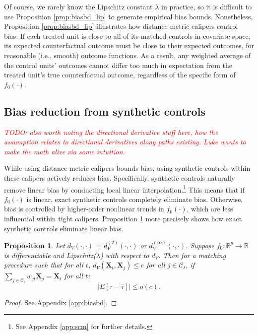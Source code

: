 \documentclass{article}
\newtheorem{proposition}[theorem]{Proposition}
\newcommand{\Xt}{\mathbf{X}_t}
\newcommand{\Xj}{\mathbf{X}_j}
\newcommand{\Ct}{\mathcal{C}_{t}}
\newcommand{\note}[1]{\textcolor{red}{\textit{#1}}}
\begin{document}
Of course, we rarely know the Lipschitz constant $\lambda$ in practice, so it is difficult to use Proposition \ref{prop:biasbd_lip} to generate empirical bias bounds.
Nonetheless, Proposition \ref{prop:biasbd_lip} illustrates how distance-metric calipers control bias:
If each treated unit is close to all of its matched controls in covariate space, its expected counterfactual outcome must be close to their expected outcomes, for reasonable (i.e., smooth) outcome functions.
As a result, any weighted average of the control units' outcomes cannot differ too much in expectation from the treated unit's true counterfactual outcome, regardless of the specific form of $f_0(\cdot)$.

\subsection{Bias reduction from synthetic controls}
\label{sec:biasbdscm}

\note{TODO: also worth noting the directional derivative stuff here, how the assumption relates to directional derivatives along paths existing.
Luke wants to make the math alive via some intuition.}

While using distance-metric calipers bounds bias, using synthetic controls within these calipers actively reduces bias.
Specifically, synthetic controls naturally remove linear bias by conducting local linear interpolation.\footnote{See Appendix \ref{app:scm} for further details.}
This means that if $f_0(\cdot)$ is linear, exact synthetic controls completely eliminate bias.
Otherwise, bias is controlled by higher-order nonlinear trends in $f_0(\cdot)$, which are less influential within tight calipers.
Proposition \ref{prop:scbiasbd} more precisely shows how exact synthetic controls eliminate linear bias.
\begin{proposition}
\label{prop:scbiasbd}
Let $d_V(\cdot, \cdot)$ = $d^{(2)}_V(\cdot, \cdot)$ or $d^{(\infty)}_V(\cdot, \cdot)$.
Suppose $f_0: \mathbb{R}^p \to \mathbb{R}$ is differentiable and Lipschitz($\lambda$) with respect to $d_V$.
Then for a matching procedure such that for all $t$, $d_V(\Xt, \Xj) \leq c$ for all $j \in \Ct$,
if $\sum_{j \in \Ct} w_{jt} \Xj = \Xt$ for all $t$:
\begin{equation*}
    \big|E[\tau - \hat{\tau}] \big| \leq o(c).
\end{equation*}
\end{proposition}
\begin{proof}
    See Appendix \ref{app:biasbd}.
\end{proof}
\end{document}
